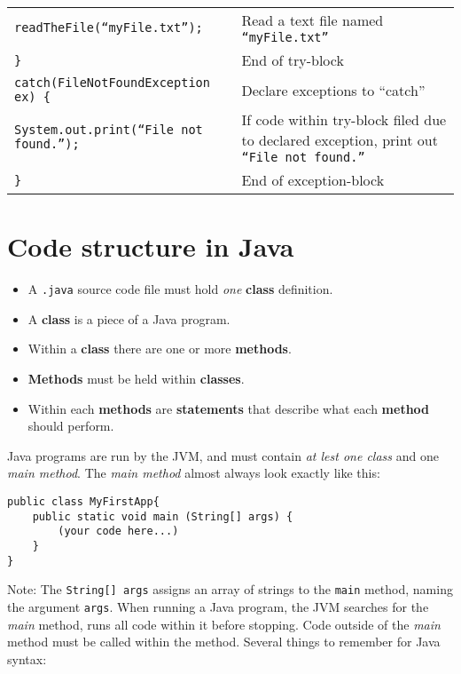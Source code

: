 \documentclass{tufte-handout}
\begin{document}
\begin{center}
\begin{tabular}{l p{6cm}}
            \hspace{3mm}\texttt{readTheFile(``myFile.txt'');} & Read a text file named \texttt{``myFile.txt''} \\ [1ex]
            \texttt{\}} & End of try-block \\ [1ex]
            \texttt{catch(FileNotFoundException ex) \{} & Declare exceptions to ``catch'' \\ [1ex]
            \hspace{3mm}\texttt{System.out.print(``File not found.'');} & If code within try-block filed due to declared exception, print out \texttt{``File not found.''} \\
            \texttt{\}} & End of exception-block                
        \end{tabular}           
    \end{center}

    \section*{Code structure in Java}
    \begin{itemize}
        \item A \texttt{.java} source code file must hold \emph{one} \textbf{class} definition.
        \item A \textbf{class} is a piece of a Java program.
        \item Within a \textbf{class} there are one or more \textbf{methods}.
        \item \textbf{Methods} must be held within \textbf{classes}.
        \item Within each \textbf{methods} are \textbf{statements} that describe what each \textbf{method} should perform.
    \end{itemize}

    Java programs are run by the JVM, and must contain \emph{at lest one class} and one \emph{main method}. The \emph{main method} almost always look exactly like this:
    \begin{lstlisting}
public class MyFirstApp{
    public static void main (String[] args) {
        (your code here...)
    }
}        
    \end{lstlisting}

    Note: The \texttt{String[] args} assigns an array of strings to the \texttt{main} method, naming the argument \texttt{args}.
    When running a Java program, the JVM searches for the \emph{main} method, runs all code within it before stopping. Code outside of the \emph{main} method must be called within the method. Several things to remember for Java syntax:
\end{document}

